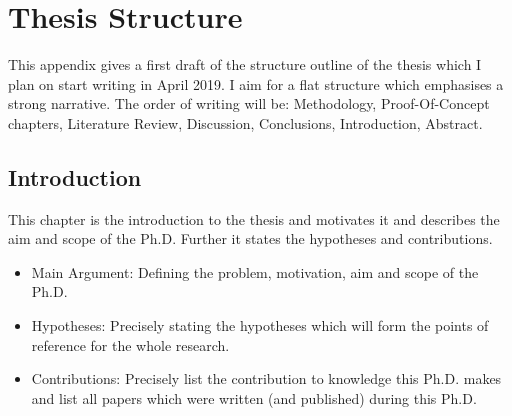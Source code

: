 \chapter{Thesis Structure}
\label{app:thesis_struct}

This appendix gives a first draft of the structure outline of the thesis which I plan on start writing in April 2019. I aim for a flat structure which emphasises a strong narrative. The order of writing will be: Methodology, Proof-Of-Concept chapters, Literature Review, Discussion, Conclusions, Introduction, Abstract.
%


\section{Introduction}
This chapter is the introduction to the thesis and motivates it and describes the aim and scope of the Ph.D. Further it states the hypotheses and contributions.
\begin{itemize}
	\item Main Argument: Defining the problem, motivation, aim and scope of the Ph.D.
	\item Hypotheses: Precisely stating the hypotheses which will form the points of reference for the whole research.
	\item Contributions: Precisely list the contribution to knowledge this Ph.D. makes and list all papers which were written (and published) during this Ph.D.
\end{itemize}

